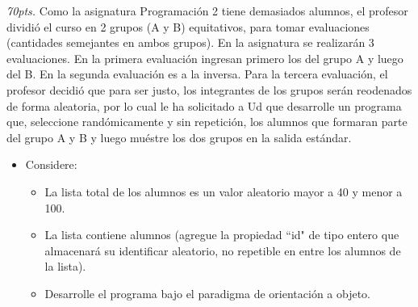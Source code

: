 \documentclass[10pt]{article}
\begin{document}
\begin{enumerate}
{\begin{multicols}{2}
\end{multicols}
}
\newpage
{\scriptsize
\item \emph{70pts.} Como la asignatura Programaci\'on 2 tiene demasiados alumnos, el profesor dividi\'o el curso en 2 grupos (A y B) equitativos, para tomar evaluaciones (cantidades semejantes en ambos grupos). En la asignatura se realizar\'an 3 evaluaciones. En la primera evaluaci\'on ingresan primero los del grupo A y luego del B. En la segunda evaluaci\'on es a la inversa. Para la tercera evaluaci\'on, el profesor decidi\'o que para ser justo, los integrantes de los grupos ser\'an reodenados de forma aleatoria, por lo cual le ha solicitado a Ud que desarrolle un programa que, seleccione rand\'omicamente y sin repetici\'on, los alumnos que formaran parte del grupo A y B y luego mu\'estre los dos grupos en la salida est\'andar.
}
\begin{itemize}
    \item[] {\scriptsize Considere:}
    \begin{itemize}
        \item {\scriptsize La lista total de los alumnos es un valor aleatorio mayor a 40 y menor a 100.}
        \item {\scriptsize La lista contiene alumnos (agregue la propiedad ``id" de tipo entero que almacenar\'a su identificar aleatorio, no repetible en entre los alumnos de la lista).}
        \item {\scriptsize Desarrolle el programa bajo el paradigma de orientación a objeto.}
    \end{itemize}
\end{itemize}


\end{enumerate}
\end{document}
